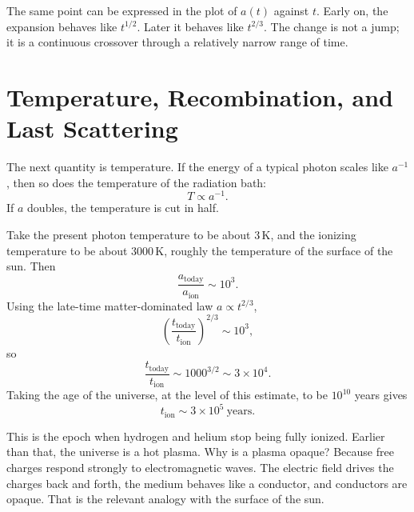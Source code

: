The same point can be expressed in the plot of \(a(t)\) against \(t\). Early on, the expansion behaves like \(t^{1/2}\). Later it behaves like \(t^{2/3}\). The change is not a jump; it is a continuous crossover through a relatively narrow range of time.

\begin{classroomqa}
\end{classroomqa}

\section{Temperature, Recombination, and Last Scattering}

The next quantity is temperature. If the energy of a typical photon scales like \(a^{-1}\), then so does the temperature of the radiation bath:
\begin{equation}
T\propto a^{-1}.
\end{equation}
If \(a\) doubles, the temperature is cut in half.

Take the present photon temperature to be about \(3\,\mathrm K\), and the ionizing temperature to be about \(3000\,\mathrm K\), roughly the temperature of the surface of the sun. Then
\begin{equation}
\frac{a_{\mathrm{today}}}{a_{\mathrm{ion}}}\sim 10^3.
\end{equation}
Using the late-time matter-dominated law \(a\propto t^{2/3}\),
\begin{equation}
\left(\frac{t_{\mathrm{today}}}{t_{\mathrm{ion}}}\right)^{2/3}\sim 10^3,
\end{equation}
so
\begin{equation}
\frac{t_{\mathrm{today}}}{t_{\mathrm{ion}}}\sim 1000^{3/2}\sim 3\times 10^4.
\end{equation}
Taking the age of the universe, at the level of this estimate, to be \(10^{10}\) years gives
\begin{equation}
t_{\mathrm{ion}}\sim 3\times 10^5\ \mathrm{years}.
\end{equation}

This is the epoch when hydrogen and helium stop being fully ionized. Earlier than that, the universe is a hot plasma. Why is a plasma opaque? Because free charges respond strongly to electromagnetic waves. The electric field drives the charges back and forth, the medium behaves like a conductor, and conductors are opaque. That is the relevant analogy with the surface of the sun.

